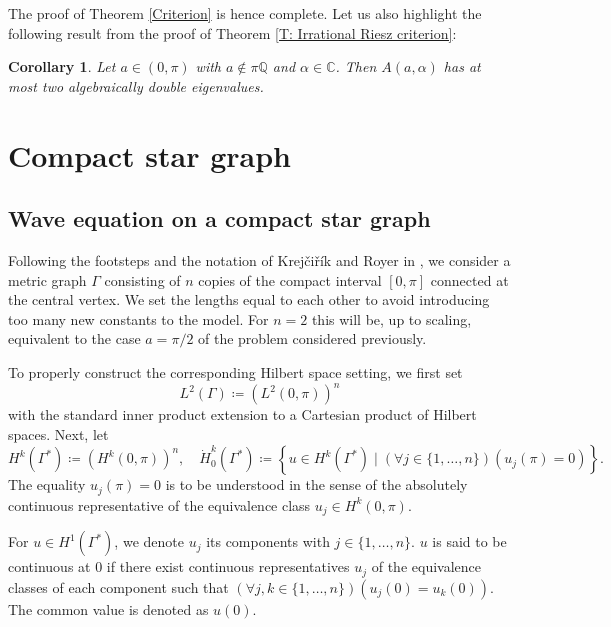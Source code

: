 \documentclass[11pt, a4paper,reqno]{amsart}
\theoremstyle{plain}
\newtheorem{corollary}[theorem]{Corollary}
\theoremstyle{definition}
\theoremstyle{remark}
\newcommand{\1}{\mathds 1}
\begin{document}
The proof of Theorem \ref{Criterion} is hence complete. Let us also highlight the following result from the proof of Theorem \ref{T: Irrational Riesz criterion}:
\begin{corollary}
    Let $a \in (0, \pi)$ with $a \notin \pi\mathbb Q$ and $\alpha \in \mathbb C$. Then $A(a, \alpha)$ has at most two algebraically double eigenvalues.
\end{corollary}

\section{Compact star graph}\label{CompactStarGraph}
\subsection{Wave equation on a compact star graph}
Following the footsteps and the notation of Krejčiřík and Royer in \cite{KrRoy}, we consider a metric graph $\Gamma$ consisting of $n$ copies of the compact interval $[0, \pi]$ connected at the central vertex. We set the lengths equal to each other to avoid introducing too many new constants to the model. For $n = 2$ this will be, up to scaling, equivalent to the case $a= \pi/2$ of the problem considered previously. 


To properly construct the corresponding Hilbert space setting, we first set
\[
L^2(\Gamma) \coloneqq \left(L^2(0, \pi)\right)^n
\]
with the standard inner product extension to a Cartesian product of Hilbert spaces. Next, let
\[
H^k(\Gamma^\ast) \coloneqq \left(H^k(0, \pi)\right)^n, \quad \dot H_0^k(\Gamma^\ast) \coloneqq \left\{u \in H^k(\Gamma^\ast) \mid (\forall j \in \{1, \dots, n\})(u_j(\pi) = 0)\right\}.
\]
The equality $u_j(\pi) = 0$ is to be understood in the sense of the absolutely continuous representative of the equivalence class $u_j \in H^k(0, \pi)$.

For $u \in H^1(\Gamma^\ast)$, we denote $u_j$ its components with $j \in \{1, \dots, n\}$. $u$ is said to be continuous at $0$ if there exist continuous representatives $u_j$ of the equivalence classes of each component such that $\left(\forall j, k \in \{1, \dots, n\}\right)\left(u_j(0) = u_k(0)\right)$. The common value is denoted as $u(0)$.
\end{document}
